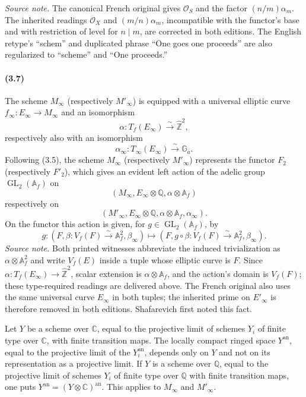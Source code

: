 \documentclass[10pt]{article}
\newcommand{\Af}{\mathbb A_f}
\newcommand{\C}{\mathbb C}
\newcommand{\Q}{\mathbb Q}
\newcommand{\bZ}{\widehat{\mathbb Z}}
\newcommand{\Ga}{\mathbb G_a}
\newcommand{\GL}{\operatorname{GL}}
\newcommand{\cO}{\mathcal O}
\newcommand{\an}{\mathrm{an}}
\begin{document}
\noindent\emph{Source note.} The canonical French original gives $\cO_S$ and the factor
$(n/m)\alpha_m$. The inherited readings $\cO_X$ and $(m/n)\alpha_m$, incompatible with the
functor's base and with restriction of level for $n\mid m$, are corrected in both editions.
The English retype's ``schem'' and duplicated phrase ``One goes one proceeds'' are also
regularized to ``scheme'' and ``One proceeds.''

\paragraph{(3.7)}
The scheme $M_\infty$ (respectively $M'_\infty$) is equipped with a universal elliptic
curve $f_\infty:E_\infty\to M_\infty$ and an isomorphism
\[
\alpha:T_f(E_\infty)\xrightarrow{\sim}\bZ^2,
\]
respectively also with an isomorphism
\[
\alpha_\infty:T_\infty(E_\infty)\xrightarrow{\sim}\Ga.
\]
Following (3.5), the scheme $M_\infty$ (respectively $M'_\infty$) represents the functor
$F_2$ (respectively $F'_2$), which gives an evident left action of the adelic group
$\GL_2(\Af)$ on
\[
(M_\infty,E_\infty\otimes\Q,\alpha\otimes\Af)
\]
respectively on
\[
(M'_\infty,E_\infty\otimes\Q,\alpha\otimes\Af,\alpha_\infty).
\]
On the functor this action is given, for $g\in\GL_2(\Af)$, by
\[
g:(F,\beta:V_f(F)\xrightarrow{\sim}\Af^2,\beta_\infty)
\longmapsto
(F,g\circ\beta:V_f(F)\xrightarrow{\sim}\Af^2,\beta_\infty).
\]
\noindent\emph{Source note.} Both printed witnesses abbreviate the induced trivialization as
$\alpha\otimes\Af^2$ and write $V_f(E)$ inside a tuple whose elliptic curve is $F$. Since
$\alpha:T_f(E_\infty)\to\bZ^2$, scalar extension is $\alpha\otimes\Af$, and the action's
domain is $V_f(F)$; these type-required readings are delivered above. The French original
also uses the same universal curve $E_\infty$ in both tuples; the inherited prime on
$E'_\infty$ is therefore removed in both editions.
Shafarevich first noted this fact.

Let $Y$ be a scheme over $\C$, equal to the projective limit of schemes $Y_i$ of finite
type over $\C$, with finite transition maps. The locally compact ringed space $Y^{\an}$,
equal to the projective limit of the $Y_i^{\an}$, depends only on $Y$ and not on its
representation as a projective limit. If $Y$ is a scheme over $\Q$, equal to the projective
limit of schemes $Y_i$ of finite type over $\Q$ with finite transition maps, one puts
$Y^{\an}=(Y\otimes\C)^{\an}$. This applies to $M_\infty$ and $M'_\infty$.
\end{document}
